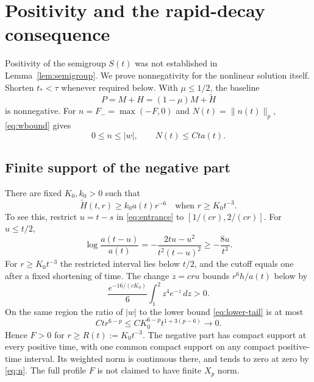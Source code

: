 \documentclass[11pt,a4paper]{article}
\numberwithin{equation}{section}
\theoremstyle{remark}
\newcommand{\dd}{\,d}
\newcommand{\norm}[2]{\lVert #1\rVert_{#2}}
\begin{document}
\section{Positivity and the rapid-decay consequence}\label{sec:positive}

Positivity of the semigroup \(S(t)\) was not established in
Lemma~\ref{lem:semigroup}. We prove nonnegativity for the nonlinear
solution itself.
Shorten \(t_*<\tau\) whenever required below. With \(\mu\leq1/2\), the
baseline
\[
 P=M+H=(1-\mu)M+\widetilde H
\]
is nonnegative. For \(n=F_-=\max(-F,0)\) and
\(N(t)=\norm{n(t)}{p}\), \eqref{eq:wbound} gives
\begin{equation}\label{eq:n}
 0\leq n\leq|w|,\qquad N(t)\leq Ct a(t).
\end{equation}

\subsection*{Finite support of the negative part}
There are fixed \(K_0,k_0>0\) such that
\begin{equation}\label{eq:lower-tail}
 \widetilde H(t,r)\geq k_0a(t)r^{-6}
       \quad\text{when }r\geq K_0t^{-3}.
\end{equation}
To see this, restrict \(u=t-s\) in \eqref{eq:entrance} to
\([1/(cr),2/(cr)]\). For \(u\leq t/2\),
\[
 \log\frac{a(t-u)}{a(t)}
   =-\frac{2tu-u^2}{t^2(t-u)^2}\geq-\frac{8u}{t^3}.
\]
For \(r\geq K_0t^{-3}\) the restricted interval lies below \(t/2\),
and the cutoff equals one after a fixed shortening of time.
The change \(z=cru\) bounds \(r^6h/a(t)\) below by
\[
 \frac{e^{-16/(cK_0)}}6\int_1^2 z^4e^{-z}\dd z>0.
\]
On the same region the ratio of \(|w|\) to the lower bound
\eqref{eq:lower-tail} is at most
\[
 Ct r^{6-p}\leq C K_0^{6-p}t^{1+3(p-6)}\longrightarrow0.
\]
Hence \(F>0\) for \(r\geq R(t):=K_0t^{-3}\).
The negative part has compact support at every positive time, with one
common compact support on any compact positive-time interval.
Its weighted norm is continuous there, and tends to zero at zero by
\eqref{eq:n}. The full profile \(F\) is not claimed to have finite
\(X_p\) norm.
\end{document}
